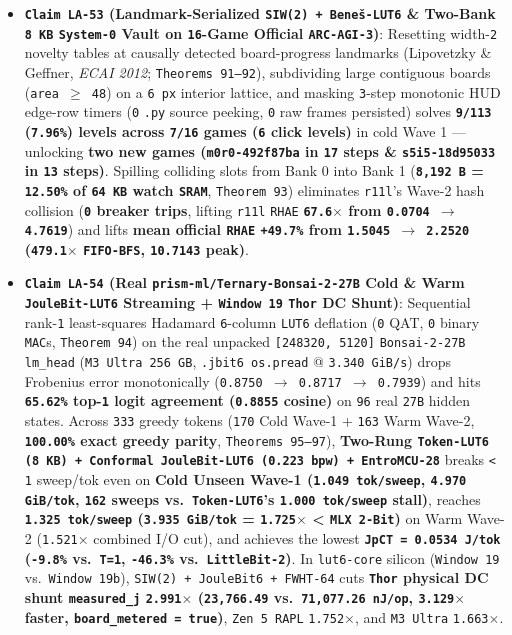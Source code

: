 \documentclass[10pt]{article}
\begin{document}
\begin{itemize}
  \item \textbf{\texttt{Claim LA-53} (Landmark-Serialized \texttt{SIW(2) + Bene\v{s}-LUT6} \& Two-Bank \texttt{8 KB} \texttt{System-0} Vault on \texttt{16}-Game Official \texttt{ARC-AGI-3})}: Resetting width-\texttt{2} novelty tables at causally detected board-progress landmarks (Lipovetzky \& Geffner, \emph{ECAI 2012}; \texttt{Theorems 91--92}), subdividing large contiguous boards (\texttt{area $\ge$ 48}) on a \texttt{6 px} interior lattice, and masking \texttt{3}-step monotonic HUD edge-row timers (\texttt{0} \texttt{.py} source peeking, \texttt{0} raw frames persisted) solves \textbf{\texttt{9/113} (\texttt{7.96\%}) levels across \texttt{7/16} games (\texttt{6} click levels)} in cold Wave 1 --- unlocking \textbf{two new games (\texttt{m0r0-492f87ba} in \texttt{17} steps \& \texttt{s5i5-18d95033} in \texttt{13} steps)}. Spilling colliding slots from Bank 0 into Bank 1 (\textbf{\texttt{8,192 B} = \texttt{12.50\%} of \texttt{64 KB} watch \texttt{SRAM}}, \texttt{Theorem 93}) eliminates \texttt{r11l}'s Wave-2 hash collision (\textbf{\texttt{0} breaker trips}, lifting \texttt{r11l} \texttt{RHAE} \textbf{\texttt{67.6$\times$} from \texttt{0.0704 $\to$ 4.7619}}) and lifts \textbf{mean official \texttt{RHAE} \texttt{+49.7\%} from \texttt{1.5045 $\to$ 2.2520} (\texttt{479.1$\times$} \texttt{FIFO-BFS}, \texttt{10.7143} peak)}.
  \item \textbf{\texttt{Claim LA-54} (Real \texttt{prism-ml/Ternary-Bonsai-2-27B} Cold \& Warm \texttt{JouleBit-LUT6} Streaming + \texttt{Window 19} \texttt{Thor} DC Shunt)}: Sequential rank-\texttt{1} least-squares Hadamard \texttt{6}-column \texttt{LUT6} deflation (\texttt{0} QAT, \texttt{0} binary \texttt{MAC}s, \texttt{Theorem 94}) on the real unpacked \texttt{[248320, 5120]} \texttt{Bonsai-2-27B} \texttt{lm\_head} (\texttt{M3 Ultra 256 GB}, \texttt{.jbit6 os.pread} @ \texttt{3.340 GiB/s}) drops Frobenius error monotonically (\texttt{0.8750 $\to$ 0.8717 $\to$ 0.7939}) and hits \textbf{\texttt{65.62\%} top-\texttt{1} logit agreement (\texttt{0.8855} cosine)} on \texttt{96} real \texttt{27B} hidden states. Across \texttt{333} greedy tokens (\texttt{170} Cold Wave-1 + \texttt{163} Warm Wave-2, \textbf{\texttt{100.00\%} exact greedy parity}, \texttt{Theorems 95--97}), \textbf{Two-Rung \texttt{Token-LUT6 (8 KB) + Conformal JouleBit-LUT6 (0.223 bpw) + EntroMCU-28}} breaks \texttt{< 1} sweep/tok even on \textbf{Cold Unseen Wave-1 (\texttt{1.049 tok/sweep}, \texttt{4.970 GiB/tok}, \texttt{162} sweeps vs.\ \texttt{Token-LUT6}'s \texttt{1.000 tok/sweep} stall)}, reaches \textbf{\texttt{1.325 tok/sweep} (\texttt{3.935 GiB/tok} = \texttt{1.725$\times$} < \texttt{MLX 2-Bit})} on Warm Wave-2 (\texttt{1.521$\times$} combined I/O cut), and achieves the lowest \textbf{\texttt{JpCT = 0.0534 J/tok} (\texttt{-9.8\%} vs.\ \texttt{T=1}, \texttt{-46.3\%} vs.\ \texttt{LittleBit-2})}. In \texttt{lut6-core} silicon (\texttt{Window 19} vs.\ \texttt{Window 19b}), \texttt{SIW(2) + JouleBit6 + FWHT-64} cuts \textbf{\texttt{Thor} physical DC shunt \texttt{measured\_j} \texttt{2.991$\times$} (\texttt{23,766.49} vs.\ \texttt{71,077.26 nJ/op}, \texttt{3.129$\times$} faster, \texttt{board\_metered = true})}, \texttt{Zen 5 RAPL} \texttt{1.752$\times$}, and \texttt{M3 Ultra} \texttt{1.663$\times$}.

\end{itemize}
\end{document}
